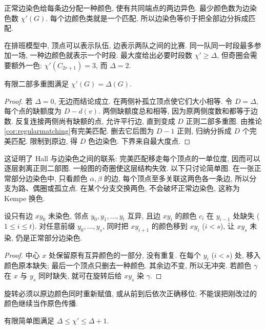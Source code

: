 \label{ch:edgecolor}
\begin{definition}
正常边染色给每条边分配一种颜色, 使有共同端点的两边异色. 最少颜色数为边染色数 $\chi'(G)$. 每个边颜色类就是一个匹配, 所以边染色等价于把全部边分拆成匹配.
\end{definition}
在排班模型中, 顶点可以表示队伍, 边表示两队之间的比赛. 同一队同一时段最多参加一场, 一种边颜色就表示一个时段. 最大度给出必要时段数 $\chi'\ge\Delta$, 但奇圈会需要额外一色: $\chi'(C_{2r+1})=3$, 而 $\Delta=2$.
\begin{theorem}[二部图边染色]\label{thm:bipartiteedge}
有限二部多重图满足 $\chi'(G)=\Delta(G)$.
\end{theorem}
\begin{proof}
若 $\Delta=0$, 无边而结论成立. 在两侧补孤立顶点使它们大小相等. 令 $D=\Delta$, 每个点的缺额度为 $D-d(v)$. 两侧缺额度总和相等, 因为原两侧度数和都等于边数. 反复连接两侧尚有缺额的点, 允许平行边, 直到变成 $D$ 正则二部多重图. 由推论\ref{cor:regularmatching}有完美匹配. 删去它后图为 $D-1$ 正则, 归纳分拆成 $D$ 个完美匹配. 限制到原边, 得 $D$ 色边染色. 下界来自最大度点.
\end{proof}
这证明了 Hall 与边染色之间的联系: 完美匹配移走每个顶点的一单位度, 因而可以逐层剥离正则二部图. 一般图的奇圈使这层结构失效.
以下只讨论简单图. 在一张正常部分边染色中, 只看颜色 $\alpha,\beta$ 的边, 每个顶点至多关联这两色各一条边, 所以分支为路、偶圈或孤立点. 在某个分支交换两色, 不会破坏正常边染色, 这称为 Kempe 换色.
\begin{lemma}[线性扇形旋转]\label{lem:fan}
设只有边 $xy_0$ 未染色, 邻点 $y_0,y_1,\ldots,y_t$ 互异, 且边 $xy_i$ 的颜色 $c_i$ 在 $y_{i-1}$ 处缺失 ($1\le i\le t$). 对任意前缀 $y_0,\ldots,y_s$, 同时把 $xy_{i+1}$ 的颜色移到 $xy_i$ ($i<s$), 让 $xy_s$ 未染, 仍是正常部分边染色.
\end{lemma}
\begin{proof}
中心 $x$ 处保留原有互异颜色的一部分, 没有重复. 在每个 $y_i$ ($i<s$) 处, 移入颜色原本缺失; 最后一个顶点只删去一种颜色. 其余边不变, 所以无冲突. 若颜色 $\gamma$ 在 $x$ 与 $y_s$ 同时缺失, 就可在旋转后给 $xy_s$ 染 $\gamma$.
\end{proof}
旋转必须以原边颜色同时重新赋值, 或从前到后依次正确移位; 不能误把刚改过的颜色继续当作原色传播.
\begin{theorem}[Vizing]\label{thm:vizing}
有限简单图满足 $\Delta\le\chi'\le\Delta+1$.
\end{theorem}
